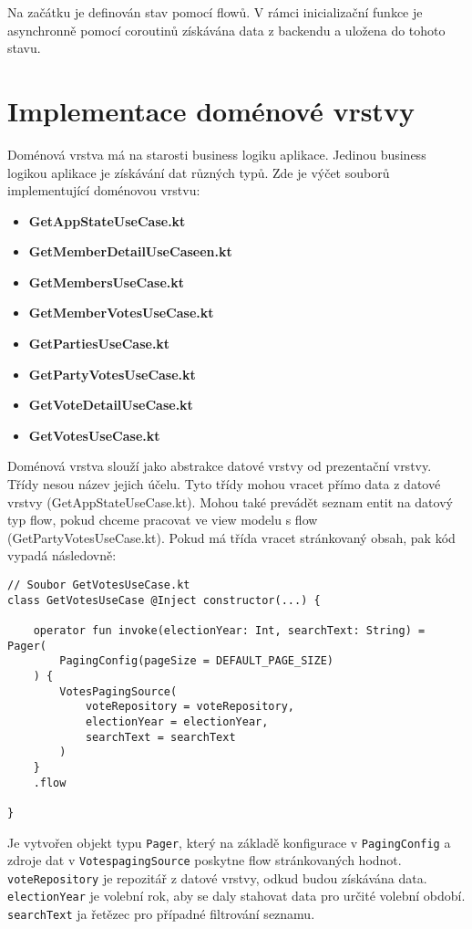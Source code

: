 \noindent Na začátku je definován stav pomocí flowů. V rámci inicializační funkce je asynchronně pomocí coroutinů získávána data z backendu a uložena do tohoto stavu. 

\section {Implementace doménové vrstvy}
Doménová vrstva má na starosti business logiku aplikace. Jedinou business logikou aplikace je získávání dat různých typů. Zde je výčet souborů implementující doménovou vrstvu:

\begin{itemize}
	\item \textbf{GetAppStateUseCase.kt}
	\item \textbf{GetMemberDetailUseCaseen.kt}
	\item \textbf{GetMembersUseCase.kt}
	\item \textbf{GetMemberVotesUseCase.kt}
	\item \textbf{GetPartiesUseCase.kt}
	\item \textbf{GetPartyVotesUseCase.kt}
	\item \textbf{GetVoteDetailUseCase.kt}
	\item \textbf{GetVotesUseCase.kt}
\end{itemize}

\noindent Doménová vrstva slouží jako abstrakce datové vrstvy od prezentační vrstvy. Třídy nesou název jejich účelu. Tyto třídy mohou vracet přímo data z datové vrstvy (GetAppStateUseCase.kt). Mohou také prevádět seznam entit na datový typ flow, pokud chceme pracovat ve view modelu s flow (GetPartyVotesUseCase.kt). Pokud má třída vracet stránkovaný obsah, pak kód vypadá následovně:

\begin{lstlisting}[caption={Ukázka využití třídy doménové vrstvy pro získání stránkovaného seznamu hlasování}, label={lst:use-case-vote}, tabsize=2]
// Soubor GetVotesUseCase.kt
class GetVotesUseCase @Inject constructor(...) {
	
	operator fun invoke(electionYear: Int, searchText: String) = Pager(
		PagingConfig(pageSize = DEFAULT_PAGE_SIZE)
	) {
		VotesPagingSource(
			voteRepository = voteRepository,
			electionYear = electionYear,
			searchText = searchText
		)
	}
	.flow
	
}
\end{lstlisting}

\noindent Je vytvořen objekt typu \lstinline|Pager|, který na základě konfigurace v \lstinline|PagingConfig| a zdroje dat v \lstinline|VotespagingSource| poskytne flow stránkovaných hodnot.  \lstinline|voteRepository| je repozitář z datové vrstvy, odkud budou získávána data. \lstinline|electionYear| je volební rok, aby se daly stahovat data pro určité volební období. \lstinline|searchText| ja řetězec pro případné filtrování seznamu.

